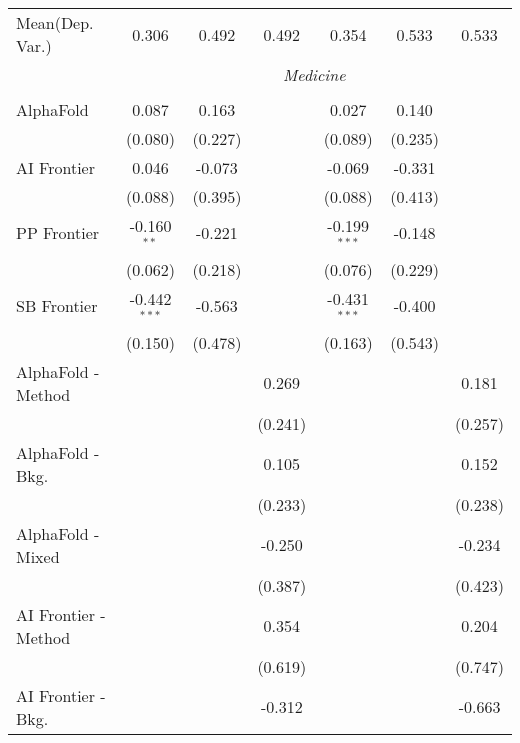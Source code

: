 \begin{tabular}{lcccccc}
Mean(Dep. Var.) & 0.306 & 0.492 & 0.492 & 0.354 & 0.533 & 0.533 \\
 & \multicolumn{6}{c}{\textit{Medicine}} \\ \\
   AlphaFold            & 0.087          & 0.163   &              & 0.027          & 0.140   &   \\   
                        & (0.080)        & (0.227) &              & (0.089)        & (0.235) &   \\   
   AI Frontier          & 0.046          & -0.073  &              & -0.069         & -0.331  &   \\   
                        & (0.088)        & (0.395) &              & (0.088)        & (0.413) &   \\   
   PP Frontier          & -0.160$^{**}$  & -0.221  &              & -0.199$^{***}$ & -0.148  &   \\   
                        & (0.062)        & (0.218) &              & (0.076)        & (0.229) &   \\   
   SB Frontier          & -0.442$^{***}$ & -0.563  &              & -0.431$^{***}$ & -0.400  &   \\   
                        & (0.150)        & (0.478) &              & (0.163)        & (0.543) &   \\   
   AlphaFold - Method   &                &         & 0.269        &                &         & 0.181\\   
                        &                &         & (0.241)      &                &         & (0.257)\\   
   AlphaFold - Bkg.     &                &         & 0.105        &                &         & 0.152\\   
                        &                &         & (0.233)      &                &         & (0.238)\\   
   AlphaFold - Mixed    &                &         & -0.250       &                &         & -0.234\\   
                        &                &         & (0.387)      &                &         & (0.423)\\   
   AI Frontier - Method &                &         & 0.354        &                &         & 0.204\\   
                        &                &         & (0.619)      &                &         & (0.747)\\   
   AI Frontier - Bkg.   &                &         & -0.312       &                &         & -0.663\\   

\end{tabular}
